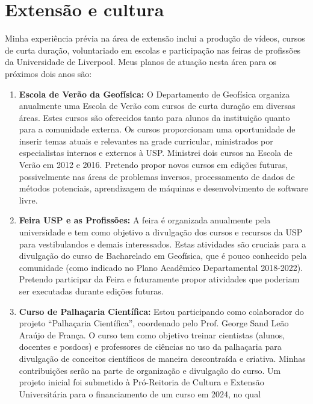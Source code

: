 \documentclass[12pt,a4paper,oneside]{book}
\begin{document}
\chapter{Extensão e cultura}

Minha experiência prévia na área de extensão inclui a produção de vídeos,
cursos de curta duração, voluntariado em escolas e participação nas feiras de
profissões da Universidade de Liverpool.
Meus planos de atuação nesta área para os próximos dois anos são:

\begin{enumerate}
  \item \textbf{Escola de Verão da Geofísica:} O Departamento de Geofísica
    organiza anualmente uma Escola de Verão com cursos de curta duração em
    diversas áreas. Estes cursos são oferecidos tanto para alunos da
    instituição quanto para a comunidade externa. Os cursos proporcionam uma
    oportunidade de inserir temas atuais e relevantes na grade curricular,
    ministrados por especialistas internos e externos à USP. Ministrei dois
    cursos na Escola de Verão em 2012 e 2016. Pretendo propor novos cursos em
    edições futuras, possivelmente nas áreas de problemas inversos,
    processamento de dados de métodos potenciais, aprendizagem de máquinas e
    desenvolvimento de software livre.
  \item \textbf{Feira USP e as Profissões:} A feira é organizada anualmente
    pela universidade e tem como objetivo a divulgação dos cursos e recursos da
    USP para vestibulandos e demais interessados. Estas atividades são cruciais
    para a divulgação do curso de Bacharelado em Geofísica, que é pouco conhecido
    pela comunidade (como indicado no Plano Acadêmico Departamental 2018-2022).
    Pretendo participar da Feira e futuramente propor atividades que poderiam
    ser executadas durante edições futuras.
  \item \textbf{Curso de Palhaçaria Científica:} Estou participando como
    colaborador do projeto ``Palhaçaria Científica'', coordenado pelo Prof.
    George Sand Leão Araújo de França. O curso tem como objetivo treinar
    cientistas (alunos, docentes e posdocs) e professores de ciências no uso da
    palhaçaria para divulgação de conceitos científicos de maneira descontraída
    e criativa. Minhas contribuições serão na parte de organização e divulgação
    do curso. Um projeto inicial foi submetido à Pró-Reitoria de Cultura e
    Extensão Universitária para o financiamento de um curso em 2024, no qual

\end{enumerate}
\end{document}
